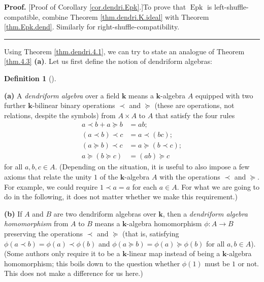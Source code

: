 \documentclass[numbers=enddot,12pt,final,onecolumn,notitlepage]{scrartcl}%
\theoremstyle{definition}
\newtheorem{defi}[theo]{Definition}
\newenvironment{definition}[1][]
{\begin{defi}[#1]\begin{leftbar}}
{\end{leftbar}\end{defi}}
\newenvironment{proof}[1][Proof]{\noindent\textbf{#1.} }{\ \rule{0.5em}{0.5em}}
\begin{document}
\begin{proof}
[Proof of Corollary \ref{cor.dendri.Epk}.]To prove that $\operatorname*{Epk}$
is left-shuffle-compatible, combine Theorem \ref{thm.dendri.K.ideal} with
Theorem \ref{thm.Epk.dend}. Similarly for right-shuffle-compatibility.
\end{proof}

Using Theorem \ref{thm.dendri.4.1}, we can try to state an analogue of Theorem
\ref{thm.4.3} \textbf{(a)}. Let us first define the notion of dendriform algebras:

\begin{definition}
\textbf{(a)} A \textit{dendriform algebra} over a field $\mathbf{k}$ means a
$\mathbf{k}$-algebra $A$ equipped with two further $\mathbf{k}$-bilinear
binary operations $\left.  \prec\right.  $ and $\left.  \succeq\right.  $
(these are operations, not relations, despite the symbols) from $A\times A$ to
$A$ that satisfy the four rules%
\begin{align*}
a\left.  \prec\right.  b+a\left.  \succeq\right.  b  &  =ab;\\
\left(  a\left.  \prec\right.  b\right)  \left.  \prec\right.  c  &  =a\left.
\prec\right.  \left(  bc\right)  ;\\
\left(  a\left.  \succeq\right.  b\right)  \left.  \prec\right.  c  &
=a\left.  \succeq\right.  \left(  b\left.  \prec\right.  c\right)  ;\\
a\left.  \succeq\right.  \left(  b\left.  \succeq\right.  c\right)   &
=\left(  ab\right)  \left.  \succeq\right.  c
\end{align*}
for all $a,b,c\in A$. (Depending on the situation, it is useful to also impose
a few axioms that relate the unity $1$ of the $\mathbf{k}$-algebra $A$ with
the operations $\left.  \prec\right.  $ and $\left.  \succeq\right.  $. For
example, we could require $1\left.  \prec\right.  a=a$ for each $a\in A$. For
what we are going to do in the following, it does not matter whether we make
this requirement.)

\textbf{(b)} If $A$ and $B$ are two dendriform algebras over $\mathbf{k}$,
then a \textit{dendriform algebra homomorphism} from $A$ to $B$ means a
$\mathbf{k}$-algebra homomorphism $\phi:A\rightarrow B$ preserving the
operations $\left.  \prec\right.  $ and $\left.  \succeq\right.  $ (that is,
satisfying $\phi\left(  a\left.  \prec\right.  b\right)  =\phi\left(
a\right)  \left.  \prec\right.  \phi\left(  b\right)  $ and $\phi\left(
a\left.  \succeq\right.  b\right)  =\phi\left(  a\right)  \left.
\succeq\right.  \phi\left(  b\right)  $ for all $a,b\in A$). (Some authors
only require it to be a $\mathbf{k}$-linear map instead of being a
$\mathbf{k}$-algebra homomorphism; this boils down to the question whether
$\phi\left(  1\right)  $ must be $1$ or not. This does not make a difference
for us here.)
\end{definition}
\end{document}
